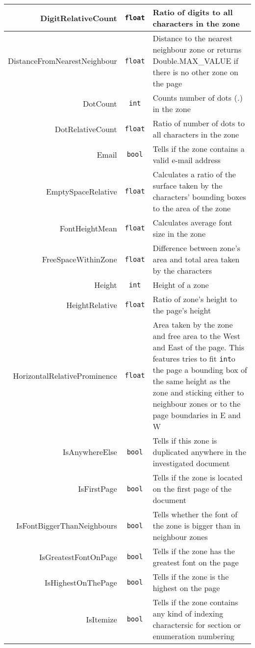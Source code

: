 \begin{appendix}
\begin{longtable}[c]{|r|c|p{8cm}|}
DigitRelativeCount & \verb+float+ & Ratio of digits to all characters in the zone \\ \hline
DistanceFromNearestNeighbour & \verb+float+ & Distance to the nearest neighbour zone or returns Double.MAX\_VALUE if there is no other zone on the page\\ \hline
DotCount & \verb+int+ & Counts number of dots (\textit{.}) in the zone\\ \hline
DotRelativeCount & \verb+float+ & Ratio of number of dots to all characters in the zone \\ \hline
Email & \verb+bool+ & Tells if the zone contains a valid e-mail address\\ \hline
EmptySpaceRelative & \verb+float+ & Calculates a ratio of the surface taken by the characters' bounding boxes to the area of the zone \\ \hline
FontHeightMean & \verb+float+ & Calculates average font size in the zone \\ \hline
FreeSpaceWithinZone & \verb+float+ & Difference between zone's area and total area taken by the characters\\ \hline
Height & \verb+int+ & Height of a zone\\ \hline
HeightRelative & \verb+float+ & Ratio of zone's height to the page's height\\ \hline
HorizontalRelativeProminence & \verb+float+ & Area taken by the zone and free area to the West and East of the page. This features tries to fit \verb+int+o the page a bounding box of the same height as the zone and sticking either to neighbour zones or to the page boundaries in E and W\\ \hline
IsAnywhereElse & \verb+bool+ & Tells if this zone is duplicated anywhere in the investigated document \\ \hline
IsFirstPage & \verb+bool+ & Tells if the zone is located on the first page of the document \\ \hline
IsFontBiggerThanNeighbours & \verb+bool+ & Tells whether the font of the zone is bigger than in neighbour zones\\ \hline
IsGreatestFontOnPage & \verb+bool+ & Tells if the zone has the greatest font on the page \\ \hline
IsHighestOnThePage & \verb+bool+ & Tells if the zone is the highest on the page \\ \hline
IsItemize & \verb+bool+ & Tells if the zone contains any kind of indexing charactersic for section or enumeration numbering \\ \hline

\end{longtable}
\end{appendix}
